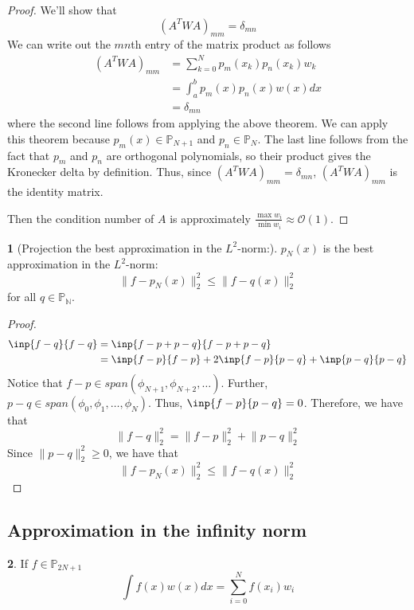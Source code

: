 \documentclass[12pt]{article}
\theoremstyle{definition}
\newcommand{\norm}[1]{\lVert#1\rVert}
\newtheorem{theorem}{\color{ForestGreen}{\textbf{Theorem}}}
\theoremstyle{definition}
\begin{document}
\begin{proof}
	We'll show that
	\begin{equation}
		(A^T W A)_{mm} = \delta_{mn}
	\end{equation}
	We can write out the $mn$th entry of the matrix product as follows
	\begin{align*}
		(A^T W A)_{mm} &= \sum_{k=0}^N p_m(x_k)p_n(x_k)w_k \\
		&= \int_a^b p_m(x)p_n(x) w(x) dx \\
		&= \delta_{mn}
	\end{align*}
	where the second line follows from applying the above theorem. We can apply this theorem because $p_m(x) \in \mathbb{P}_{N+1}$ and $p_n \in \mathbb{P}_{N}$. The last line follows from the fact that $p_m$ and $p_n$ are orthogonal polynomials, so their product gives the Kronecker delta by definition. Thus, since  $(A^T W A)_{mm} = \delta_{mn}$, $(A^T W A)_{mm} $ is the identity matrix. 

	Then the condition number of $A$ is approximately $\frac{\max w_i}{\min w_i} \approx \mathcal{O}(1)$.
\end{proof}


\begin{theorem}[Projection the best approximation in the $L^2$-norm:]
	$p_N(x)$ is the best approximation in the $L^2$-norm:
	\begin{equation}
		\norm{f-p_N(x)}^2_2 \leq \norm{f-q(x)}^2_2
	\end{equation}
	for all $q \in \mathbb{P_N}$.
\end{theorem}
\begin{proof}
\begin{align*}
	\inp{f-q}{f-q} &= \inp{f-p+p-q}{f-p+p-q} \\
	&= \inp{f-p}{f-p} + 2\inp{f-p}{p-q} + \inp{p-q}{p-q} 
\end{align*}
Notice that $f-p \in span(\phi_{N+1}, \phi_{N+2}, \ldots)$. Further, $p-q \in span(\phi_0, \phi_1, \ldots, \phi_N)$. Thus, $\inp{f-p}{p-q} = 0$. Therefore, we have that
\begin{equation}
	\norm{f-q}^2_2 = \norm{f-p}^2_2 + \norm{p-q}^2_2
\end{equation}
Since $\norm{p-q}^2_2 \geq 0$, we have that 
\begin{equation}
	\norm{f-p_N(x)}^2_2 \leq \norm{f-q(x)}^2_2
\end{equation}
\end{proof}

\subsection{Approximation in the infinity norm}
\begin{theorem}
If $f \in \mathbb{P}_{2N+1}$
\begin{equation}
	\int f(x)w(x)dx = \sum_{i=0}^N f(x_i)w_i 
\end{equation}
\end{theorem}
\end{document}
